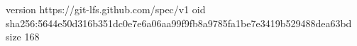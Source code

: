 version https://git-lfs.github.com/spec/v1
oid sha256:5644e50d316b351dc0e7e6a06aa99f9fb8a9785fa1be7e3419b529488dea63bd
size 168
